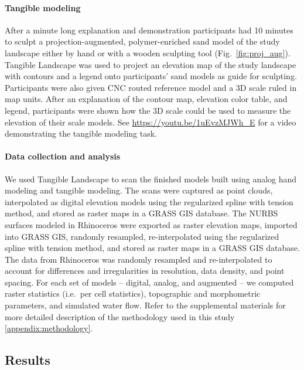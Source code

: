 \documentclass[Afour,sageh,times]{sagej}
\begin{document}
\paragraph{Tangible modeling}
After a minute long explanation and demonstration
participants had 10 minutes to sculpt
a projection-augmented, polymer-enriched sand model
of the study landscape 
either by hand or with a wooden sculpting tool 
(Fig.~\ref{fig:proj_aug}). 
Tangible Landscape was used to project 
an elevation map of the study landscape
with contours and a legend
onto participants' sand models as guide for sculpting. 
Participants were also given CNC routed reference model and 
a 3D scale ruled in map units. 
After an explanation of the contour map, elevation color table, and legend,
participants were shown how the 3D scale could be used to 
measure the elevation of their scale models.
See \url{https://youtu.be/1uEvzMJWh_E}
for a video demonstrating the tangible modeling task.

\paragraph{Data collection and analysis}
We used Tangible Landscape to scan the finished models 
built using analog hand modeling and tangible modeling.
The scans were captured as point clouds, interpolated 
as digital elevation models 
using the regularized spline with tension method,
and stored as raster maps in a GRASS GIS database. 
The NURBS surfaces modeled in Rhinoceros 
were exported as raster elevation maps,
imported into GRASS GIS, randomly resampled, 
re-interpolated using the regularized spline with tension method, 
and stored as raster maps in a GRASS GIS database. 
The data from Rhinoceros 
was randomly resampled and re-interpolated to account for 
differences and irregularities in resolution, data density, and point spacing.
For each set of models -- digital, analog, and augmented --
we computed raster statistics (i.e.~per cell statistics), 
topographic and morphometric parameters, 
and simulated water flow.
%
Refer to the supplemental materials 
for more detailed description of the methodology
used in this study
\ref{appendix:methodology}.



\subsection{Results}
\end{document}
